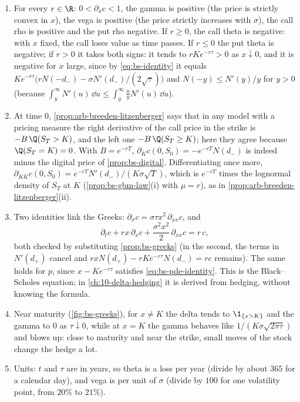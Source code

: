\begin{remark}\label{rem:bs-greeks-reading}
\begin{enumerate}[label=(\alph*),leftmargin=*]
  \item For every $r\in\R$: $0<\partial_xc<1$, the gamma is positive (the price is strictly
    convex in $x$), the vega is positive (the price strictly increases with $\sigma$), the
    call rho is positive and the put rho negative. If $r\ge0$, the call theta is negative:
    with $x$ fixed, the call loses value as time passes. If $r\le0$ the put theta is negative;
    if $r>0$ it takes both signs: it tends to $rKe^{-r\tau}>0$ as $x\downarrow0$, and it is
    negative for $x$ large, since by \eqref{eq:bs-identity} it equals
    $Ke^{-r\tau}\big(rN(-d_-)-\sigma N'(d_-)/(2\sqrt\tau)\big)$ and $N(-y)\le N'(y)/y$ for $y>0$
    (because $\int_y^\infty N'(u)\,\dd u\le\int_y^\infty\frac uyN'(u)\,\dd u$).
  \item At time $0$, \cref{prop:arb-breeden-litzenberger} says that in any model with a
    pricing measure the right derivative of the call price in the strike is $-B\,\Q(S_T>K)$,
    and the left one $-B\,\Q(S_T\ge K)$; here they agree because $\Q(S_T=K)=0$. With
    $B=e^{-rT}$, $\partial_Kc(0,S_0)=-e^{-rT}N(d_-)$ is indeed minus the digital price of
    \cref{prop:bs-digital}. Differentiating once more,
    $\partial_{KK}c(0,S_0)=e^{-rT}N'(d_-)/(K\sigma\sqrt T)$, which is $e^{-rT}$ times the
    lognormal density of $S_T$ at $K$ (\cref{prop:bs-gbm-law}(i) with $\mu=r$), as in
    \cref{prop:arb-breeden-litzenberger}(ii).
  \item Two identities link the Greeks: $\partial_\sigma c=\sigma\tau x^2\,\partial_{xx}c$, and
    \begin{equation}\label{eq:bs-pde-identity}
      \partial_tc+rx\,\partial_xc+\frac{\sigma^2x^2}{2}\,\partial_{xx}c=r\,c ,
    \end{equation}
    both checked by substituting \cref{prop:bs-greeks} (in the second, the terms in $N'(d_+)$ cancel and
    $rxN(d_+)-rKe^{-r\tau}N(d_-)=rc$ remains). The same holds for $p$, since $x-Ke^{-r\tau}$
    satisfies \eqref{eq:bs-pde-identity}. This is the Black--Scholes equation; in
    \cref{ch:10-delta-hedging} it is derived from hedging, without knowing the formula.
  \item Near maturity (\cref{fig:bs-greeks}), for $x\ne K$ the delta tends to $\1_{\{x>K\}}$
    and the gamma to $0$ as $\tau\downarrow0$, while at $x=K$ the gamma behaves like
    $1/(K\sigma\sqrt{2\pi\tau})$ and blows up: close to maturity and near the strike, small
    moves of the stock change the hedge a lot.
  \item Units: $t$ and $\tau$ are in years, so theta is a loss per year (divide by about
    $365$ for a calendar day), and vega is per unit of $\sigma$ (divide by $100$ for one
    volatility point, from $20\%$ to $21\%$).
\end{enumerate}
\end{remark}

